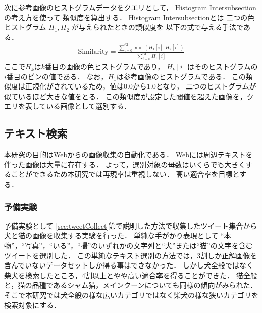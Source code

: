 \documentclass{deimj}
\begin{document}
次に参考画像のヒストグラムデータをクエリとして，
Histogram Intersubsection\cite{Swain91colorindexing}
の考え方を使って
類似度を算出する．
Histogram Intersubsectionとは
二つの色ヒストグラム
$H_1,H_2$
が与えられたときの類似度を
以下の式で与える手法である．
%
\begin{eqnarray}
\mbox{Similarity} = \frac{\sum_{i=0}^{63} \min(H_1[i],H_2[i])}{\sum_{i=0}^{63} H_1[i]}
\end{eqnarray}
%
ここで$H_k$は$k$番目の画像の色ヒストグラムであり，
$H_k[i]$はそのヒストグラムの$i$番目のビンの値である．
なお，$H_1$は参考画像のヒストグラムである．
この類似度は正規化がされているため，値は0.0から1.0となり，
二つのヒストグラムが似ているほど大きな値をとる．
この類似度が設定した閾値を超えた画像を，クエリを表している画像として選別する．
\subsection{テキスト検索}
\label{sec:textSearch}

本研究の目的はWebからの画像収集の自動化である．
Webには周辺テキストを伴った画像は大量に存在する．
よって，選別対象の母数はいくらでも大きくすることができるため本研究では再現率は重視しない．
高い適合率を目標とする．

\subsubsection{予備実験}
\label{sec:yobijikken}

予備実験として
\ref{sec:tweetCollect}節で説明した方法で収集したツイート集合から
犬と猫の画像を収集する実験を行った．
単純な手がかり表現として
“本物”，“写真”，“いる”，“撮”のいずれかの文字列と“犬”または“猫”の文字を含むツイートを選別した．
この単純なテキスト選別の方法では，3割しか正解画像を含んでいないデータセットしか得る事はできなかった．
しかし犬全般ではなく柴犬を検索したところ，4割以上とやや高い適合率を得ることができた．
猫全般と，猫の品種であるシャム猫，メインクーンについても同様の傾向がみられた．
そこで本研究では犬全般の様な広いカテゴリではなく柴犬の様な狭いカテゴリを検索対象にする．
\end{document}
